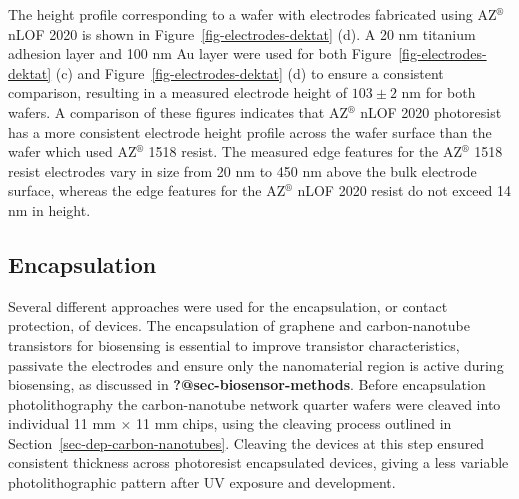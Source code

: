 \documentclass[
  a4paper,
]{scrbook}
\begin{document}
The height profile corresponding to a wafer with electrodes fabricated
using AZ\(^\circledR\) nLOF 2020 is shown in
Figure~\ref{fig-electrodes-dektat} (d). A 20 nm titanium adhesion layer
and 100 nm Au layer were used for both
Figure~\ref{fig-electrodes-dektat} (c) and
Figure~\ref{fig-electrodes-dektat} (d) to ensure a consistent
comparison, resulting in a measured electrode height of \(103\pm2\) nm
for both wafers. A comparison of these figures indicates that
AZ\(^\circledR\) nLOF 2020 photoresist has a more consistent electrode
height profile across the wafer surface than the wafer which used
AZ\(^\circledR\) 1518 resist. The measured edge features for the
AZ\(^\circledR\) 1518 resist electrodes vary in size from 20 nm to 450
nm above the bulk electrode surface, whereas the edge features for the
AZ\(^\circledR\) nLOF 2020 resist do not exceed 14 nm in height.

\hypertarget{sec-encapsulation}{%
\subsection{Encapsulation}\label{sec-encapsulation}}

Several different approaches were used for the encapsulation, or contact
protection, of devices. The encapsulation of graphene and
carbon-nanotube transistors for biosensing is essential to improve
transistor characteristics, passivate the electrodes and ensure only the
nanomaterial region is active during biosensing, as discussed in
\textbf{?@sec-biosensor-methods}. Before encapsulation photolithography
the carbon-nanotube network quarter wafers were cleaved into individual
11 mm \(\times\) 11 mm chips, using the cleaving process outlined in
Section~\ref{sec-dep-carbon-nanotubes}. Cleaving the devices at this
step ensured consistent thickness across photoresist encapsulated
devices, giving a less variable photolithographic pattern after UV
exposure and development.
\end{document}
